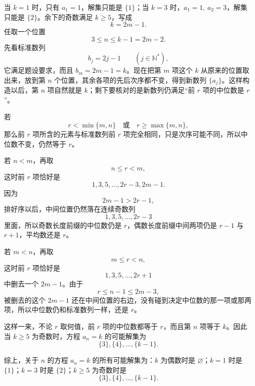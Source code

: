 \begin{solution}
当 $k=1$ 时，只有 $a_1=1$，解集只能是 $\{1\}$；当 $k=3$ 时，$a_1=1,\ a_2=3$，解集只能是 $\{2\}$。余下的奇数满足 $k\ge5$，写成
\[
k=2m-1.
\]
任取一个位置
\[
3\le n\le k-1=2m-2.
\]
先看标准数列
\[
b_j=2j-1\qquad (j\in\mathbb N^*),
\]
它满足题设要求，而且 $b_m=2m-1=k$。现在把第 $m$ 项这个 $k$ 从原来的位置取出来，放到第 $n$ 个位置，其余各项的先后次序都不变，得到新数列 $\{a_j\}$。这样构造以后，第 $n$ 项自然就是 $k$；剩下要核对的是新数列仍满足“前 $r$ 项的中位数是 $r$”。

若
\[
r<\min\{m,n\}\quad\text{或}\quad r\ge \max\{m,n\},
\]
那么前 $r$ 项所含的元素与标准数列前 $r$ 项完全相同，只是次序可能不同，所以中位数不变，仍然等于 $r$。

若 $n<m$，再取
\[
n\le r<m,
\]
这时前 $r$ 项恰好是
\[
1,3,5,\dots,2r-3,2m-1.
\]
因为
\[
2m-1>2r-1,
\]
排好序以后，中间位置仍然落在连续奇数列
\[
1,3,5,\dots,2r-3
\]
里面，所以奇数长度前缀的中位数仍是 $r$，偶数长度前缀中间两项仍是 $r-1$ 与 $r+1$，平均数还是 $r$。

若 $m<n$，再取
\[
m\le r<n,
\]
这时前 $r$ 项恰好是
\[
1,3,5,\dots,2r+1
\]
中删去一个 $2m-1$。由于
\[
r\le n-1\le 2m-3,
\]
被删去的这个 $2m-1$ 还在中间位置的右边，没有碰到决定中位数的那一项或那两项，所以中位数仍和标准数列一样，还是 $r$。

这样一来，不论 $r$ 取何值，前 $r$ 项的中位数都等于 $r$，而且第 $n$ 项等于 $k$。因此当 $k\ge 5$ 为奇数时，方程 $a_n=k$ 的可能解集为
\[
\{3\},\{4\},\dots,\{k-1\}.
\]

综上，关于 $n$ 的方程 $a_n=k$ 的所有可能解集为：$k$ 为偶数时是 $\varnothing$；$k=1$ 时是 $\{1\}$；$k=3$ 时是 $\{2\}$；$k\ge 5$ 为奇数时是
\[
\{3\},\{4\},\dots,\{k-1\}.
\]
\end{solution}




